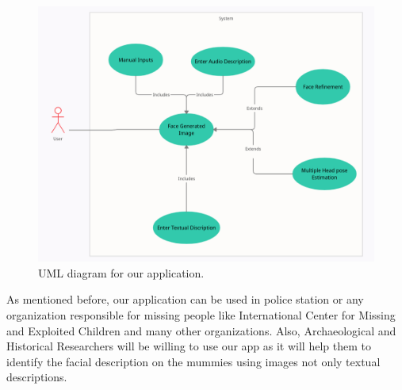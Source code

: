 
\begin{figure}[H]
    \centering
    \includegraphics[width=\textwidth]{images/Puml.png}
    \caption{UML diagram for our application.}
    \label{fig:UMLD}
\end{figure}

As mentioned before, our application can be used in police station or any organization responsible for missing people like International Center for Missing and Exploited Children and many other organizations.
Also, Archaeological and Historical Researchers will be willing to use our app as it will help them to identify the facial description on the mummies using images not only textual descriptions.